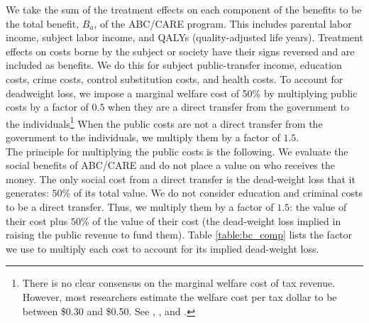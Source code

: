 \noindent We take the sum of the treatment effects on each component of the benefits to be the total benefit, $B_a$, of the ABC/CARE program. This includes parental labor income, subject labor income, and QALYs (quality-adjusted life years). Treatment effects on costs borne by the subject or society have their signs reversed and are included as benefits. We do this for subject public-transfer income, education costs, crime costs, control substitution costs, and health costs. To account for deadweight loss, we impose a marginal welfare cost of 50\% by multiplying public costs by a factor of $0.5$ when they are a direct transfer from the government to the individuals\footnote{There is no clear consensus on the marginal welfare cost of tax revenue. However, most researchers estimate the welfare cost per tax dollar to be between \$0.30 and \$0.50. See \citet{Feldstein_1999_REStat}, \citet{Heckman_Smith_1998_evaluating}, and \citet{Browning_1987_AER}.} When the public costs are not a direct transfer from the government to the individuals, we multiply them by a factor of $1.5$.\\

\noindent The principle for multiplying the public costs is the following. We evaluate the social benefits of ABC/CARE and do not place a value on who receives the money. The only social cost from a direct transfer is the dead-weight loss that it generates: $50\%$ of its total value. We do not consider education and criminal costs to be a direct transfer. Thus, we multiply them by a factor of $1.5$: the value of their cost plus $50\%$ of the value of their cost (the dead-weight loss implied in raising the public revenue to fund them). Table \ref{table:bc_comp} lists the factor we use to multiply each cost to account for its implied dead-weight loss.\\

